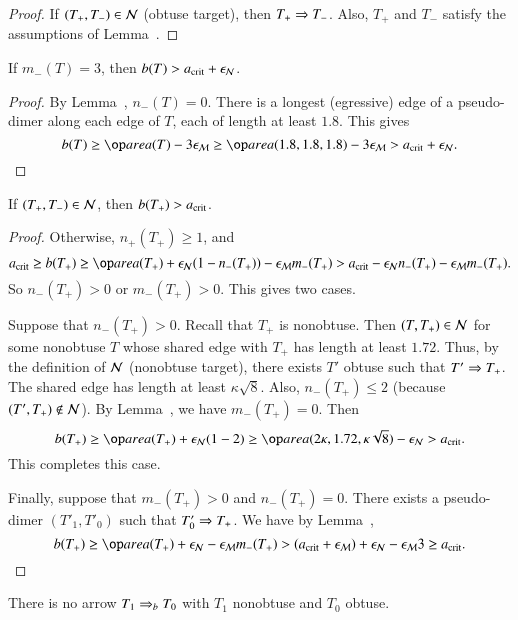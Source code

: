 \begin{proof} If $(T_+,T_-)\in \mathcal N$ (obtuse target), then $T_+\Rightarrow T_-$.
  Also, $T_+$ and $T_-$ satisfy the assumptions of
  Lemma~.
\end{proof}

\begin{lemma} 
If $m_-(T) = 3$, then $b(T) > a_\text{crit} + \epsilon_{\mathcal N}$.
\end{lemma}

\begin{proof} By Lemma~, $n_-(T)=0$.  There is a
  longest (egressive) edge of a pseudo-dimer along each edge of $T$,
  each of length at least $1.8$.  This gives
\[
b(T) \ge \area(T) - 3\epsM 
\ge \area(1.8,1.8,1.8) - 3\epsM > \acrit + \epsN.
\]
\end{proof}

\begin{lemma}  
  If $(T_+,T_-)\in \mathcal N$, then $b(T_+)>a_\text{crit}$.
\end{lemma}

\begin{proof}  Otherwise, $n_+(T_+)\ge 1$, and
\[
\acrit \ge b(T_+) 
\ge \area(T_+) + \epsN (1 - n_-(T_+)) - \epsM m_-(T_+)
> \acrit - \epsN n_-(T_+) - \epsM m_-(T_+).
\]
So $n_-(T_+) > 0$ or $m_-(T_+)>0$. This gives two cases.  

Suppose that $n_-(T_+) >0$.  Recall that $T_+$ is nonobtuse.  Then
$(T,T_+)\in\mathcal N$ for some nonobtuse $T$ whose shared edge with $T_+$ has
length at least $1.72$.  Thus, by the definition of $\mathcal N$ (nonobtuse
target), there exists $T'$ obtuse such that $T'\Rightarrow T_+$.  The shared
edge has length at least $\kappa\sqrt8$.  Also, $n_-(T_+)\le 2$
(because $(T',T_+)\not\in \mathcal N$).  By Lemma~, we have
$m_-(T_+)=0$.  Then
\[
b(T_+) \ge \area(T_+) + \epsN (1 - 2) 
\ge \area (2\kappa,1.72,\kappa\sqrt8) - \epsN > \acrit.
\]
This completes this case.

Finally, suppose that $m_-(T_+)>0$ and $n_-(T_+)=0$.  There exists a
pseudo-dimer $(T'_1,T'_0)$ such that $T'_0\Rightarrow T_+$.  We have
by Lemma~,
\[
b(T_+) \ge \area(T_+)+\epsN - \epsM m_-(T_+) 
> (\acrit + \epsM) + \epsN -\epsM  3 \ge \acrit.
\]
\end{proof}



\begin{lemma} 
  There is no arrow $T_1 \Rightarrow_{b} T_0$ with $T_1$ nonobtuse and $T_0$
  obtuse.
\end{lemma}

